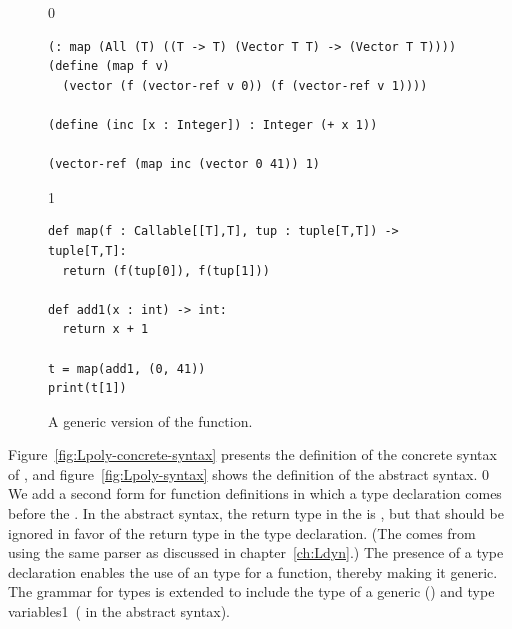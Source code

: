 \documentclass[7x10]{TimesAPriori_MIT}%
\def\racketEd{0}
\def\pythonEd{1}
\def\edition{1}
\newcommand{\pythonColor}[0]{}
\newcommand{\python}[1]{{\if\edition\pythonEd\pythonColor #1\fi}}
\numberwithin{theorem}{chapter}
\numberwithin{definition}{chapter}
\numberwithin{equation}{chapter}
\begin{document}
\begin{figure}[tbp]
\begin{tcolorbox}[colback=white]  
{\if\edition\racketEd
\begin{lstlisting}
(: map (All (T) ((T -> T) (Vector T T) -> (Vector T T))))
(define (map f v)
  (vector (f (vector-ref v 0)) (f (vector-ref v 1))))

(define (inc [x : Integer]) : Integer (+ x 1))

(vector-ref (map inc (vector 0 41)) 1)
\end{lstlisting}
\fi}
{\if\edition\pythonEd\pythonColor
\begin{lstlisting}
def map(f : Callable[[T],T], tup : tuple[T,T]) -> tuple[T,T]:
  return (f(tup[0]), f(tup[1]))

def add1(x : int) -> int:
  return x + 1

t = map(add1, (0, 41))
print(t[1])
\end{lstlisting}
\fi}
\end{tcolorbox}

\caption{A generic version of the  function.}
\label{fig:map-poly}
\end{figure}

Figure~\ref{fig:Lpoly-concrete-syntax} presents the definition of the
concrete syntax of \LangPoly{}, and figure~\ref{fig:Lpoly-syntax}
shows the definition of the abstract syntax.
%
{\if\edition\racketEd
We add a second form for function definitions in which a type
declaration comes before the . In the abstract syntax,
the return type in the  is \CANYTY{}, but that should be
ignored in favor of the return type in the type declaration.  (The
\CANYTY{} comes from using the same parser as discussed in
chapter~\ref{ch:Ldyn}.)  The presence of a type declaration
enables the use of an  type for a function, thereby making
it generic.
\fi}
%
The grammar for types is extended to include the type of a generic
() and type variables\python{\ ( in the
  abstract syntax)}.

\newcommand{\LpolyGrammarRacket}{
\begin{array}{lcl}
  \Type &::=& \LP\key{All}~\LP\Var\ldots\RP~ \Type\RP \MID \Var \\
  \Def &::=& \LP\key{:}~\Var~\Type\RP \\
    &&       \LP\key{define}~ \LP\Var ~ \Var\ldots\RP ~ \Exp\RP 
\end{array}
}

\newcommand{\LpolyASTRacket}{
\begin{array}{lcl}
  \Type &::=& \LP\key{All}~\LP\Var\ldots\RP~ \Type\RP \MID \Var \\
  \Def &::=& \DECL{\Var}{\Type} \\
   &&  \DEF{\Var}{\LP\Var \ldots\RP}{\key{'Any}}{\code{'()}}{\Exp}  
\end{array}
}  
\end{document}
